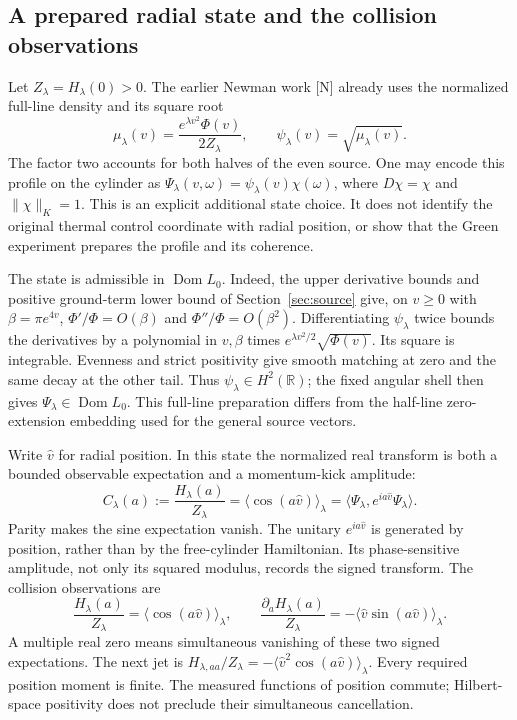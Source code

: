 \documentclass[11pt,letterpaper]{article}
\numberwithin{equation}{section}
\theoremstyle{remark}
\DeclareMathOperator{\Dom}{Dom}
\newcommand{\R}{\mathbb R}
\newcommand{\evid}[1]{\textsf{[#1]}}
\begin{document}
\subsection{A prepared radial state and the collision observations}

Let \(Z_\lambda=H_\lambda(0)>0\). The earlier Newman work \evid{N}
already uses the normalized full-line density and its square root
\begin{equation}
 \mu_\lambda(v)=\frac{e^{\lambda v^2}\Phi(v)}{2Z_\lambda},
 \qquad \psi_\lambda(v)=\sqrt{\mu_\lambda(v)}.
 \label{eq:newman-state}
\end{equation}
The factor two accounts for both halves of the even source. One may
encode this profile on the cylinder as
\(\Psi_\lambda(v,\omega)=\psi_\lambda(v)\chi(\omega)\), where
\(D\chi=\chi\) and \(\|\chi\|_K=1\). This is an explicit additional
state choice. It does not identify the original thermal control
coordinate with radial position, or show that the Green experiment
prepares the profile and its coherence.

The state is admissible in \(\Dom L_0\). Indeed, the upper derivative
bounds and positive ground-term lower bound of
Section~\ref{sec:source} give, on \(v\ge0\) with
\(\beta=\pi e^{4v}\),
\(\Phi'/\Phi=O(\beta)\) and \(\Phi''/\Phi=O(\beta^2)\).
Differentiating \(\psi_\lambda\) twice bounds the derivatives by a
polynomial in \(v,\beta\) times
\(e^{\lambda v^2/2}\sqrt{\Phi(v)}\). Its square is integrable.
Evenness and strict positivity give smooth matching at zero and the
same decay at the other tail. Thus \(\psi_\lambda\in H^2(\R)\);
the fixed angular shell then gives \(\Psi_\lambda\in\Dom L_0\).
This full-line preparation differs from the half-line zero-extension
embedding used for the general source vectors.

Write \(\widehat v\) for radial position. In this state the normalized
real transform is both a bounded observable expectation and a
momentum-kick amplitude:
\begin{equation}
 C_\lambda(a):=\frac{H_\lambda(a)}{Z_\lambda}
 =\langle\cos(a\widehat v)\rangle_\lambda
 =\langle\Psi_\lambda,e^{ia\widehat v}\Psi_\lambda\rangle.
 \label{eq:newman-amplitude}
\end{equation}
Parity makes the sine expectation vanish. The unitary
\(e^{ia\widehat v}\) is generated by position, rather than by
the free-cylinder Hamiltonian. Its phase-sensitive amplitude, not
only its squared modulus, records the signed transform.
The collision observations are
\begin{equation}
 \frac{H_\lambda(a)}{Z_\lambda}=\langle\cos(a\widehat v)\rangle_\lambda,
 \qquad
 \frac{\partial_aH_\lambda(a)}{Z_\lambda}
       =-\langle\widehat v\sin(a\widehat v)\rangle_\lambda.
 \label{eq:collision-observables}
\end{equation}
A multiple real zero means simultaneous vanishing of these two
signed expectations. The next jet is
\(H_{\lambda,aa}/Z_\lambda
=-\langle\widehat v^2\cos(a\widehat v)\rangle_\lambda\).
Every required position moment is finite. The measured functions
of position commute; Hilbert-space positivity does not preclude
their simultaneous cancellation.
\end{document}
